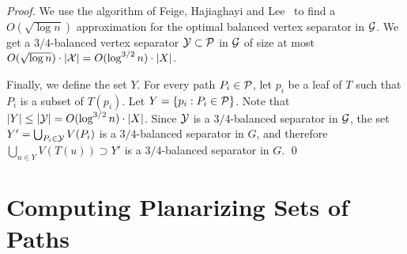 \documentclass[envcountsect]{llncs}
\begin{document}
\begin{proof}
We use the algorithm of Feige, Hajiaghayi and Lee~\cite{FHL08} to find 
a $O(\sqrt{\log n})$ approximation for the optimal balanced vertex separator in $\cal G$. 
We get a $3/4$-balanced vertex separator ${\cal Y} \subset {\cal P}$ in $\cal G$ of size  at most
$O(\sqrt{\log n}) \cdot |{\cal X}| = O(\log^{3/2} n) \cdot |X|$.

Finally, we define the set $Y$. 
For every path $P_i \in {\cal P}$, let $p_i$ be a leaf of $T$ such that $P_i$ is a subset of $T(p_i)$. 
Let $Y= \{p_i: P_i \in {\cal P}\}$. 
Note that  $|Y| \leq |{\cal Y}| = O(\log^{3/2} n) \cdot |X|$.
Since $\cal Y$ is a $3/4$-balanced separator in $\cal G$, the set
$Y' = \bigcup_{P_i \in {\cal Y}} V(P_i)$ is a $3/4$-balanced 
separator in $G$, and therefore $\bigcup_{u\in Y} V(T(u)) \supset Y'$ 
is a $3/4$-balanced separator in $G$. 
\qed
\end{proof}

\section{Computing Planarizing Sets of Paths}
\end{document}
